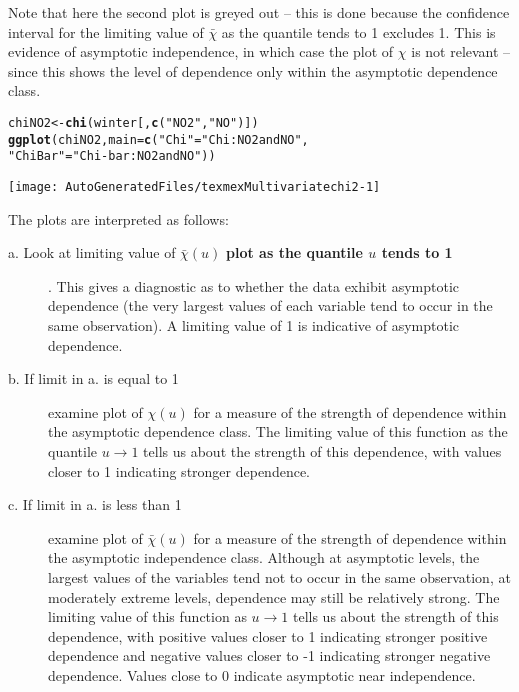 \documentclass[10pt]{article}\usepackage[]{graphicx}\usepackage[]{color}
\makeatletter
\def\maxwidth{ %
  \ifdim\Gin@nat@width>\linewidth
    \linewidth
  \else
    \Gin@nat@width
  \fi
}
\newcommand{\hlstr}[1]{\textcolor[rgb]{0.192,0.494,0.8}{#1}}%
\newcommand{\hlstd}[1]{\textcolor[rgb]{0.345,0.345,0.345}{#1}}%
\newcommand{\hlkwb}[1]{\textcolor[rgb]{0.69,0.353,0.396}{#1}}%
\newcommand{\hlkwc}[1]{\textcolor[rgb]{0.333,0.667,0.333}{#1}}%
\newcommand{\hlkwd}[1]{\textcolor[rgb]{0.737,0.353,0.396}{\textbf{#1}}}%
\newenvironment{kframe}{%
 \def\at@end@of@kframe{}%
 \ifinner\ifhmode%
  \def\at@end@of@kframe{\end{minipage}}%
  \begin{minipage}{\columnwidth}%
 \fi\fi%
 \def\FrameCommand##1{\hskip\@totalleftmargin \hskip-\fboxsep
 \colorbox{shadecolor}{##1}\hskip-\fboxsep
     \hskip-\linewidth \hskip-\@totalleftmargin \hskip\columnwidth}%
 \MakeFramed {\advance\hsize-\width
   \@totalleftmargin\z@ \linewidth\hsize
   \@setminipage}}%
 {\par\unskip\endMakeFramed%
 \at@end@of@kframe}
\newenvironment{knitrout}{}{} %
\makeatother
\begin{document}
Note that here the second plot is greyed out -- this is done because the confidence interval for the limiting value of $\bar\chi$ as the quantile tends to 1 excludes 1.  This is evidence of asymptotic independence, in which case the plot of $\chi$ is not relevant -- since this shows the level of dependence only within the asymptotic dependence class.

\begin{knitrout}
\color{fgcolor}\begin{kframe}
\begin{alltt}
\hlstd{chiNO2} \hlkwb{<-} \hlkwd{chi}\hlstd{(winter[,} \hlkwd{c}\hlstd{(}\hlstr{"NO2"}\hlstd{,} \hlstr{"NO"}\hlstd{)])}
\hlkwd{ggplot}\hlstd{(chiNO2,} \hlkwc{main}\hlstd{=}\hlkwd{c}\hlstd{(}\hlstr{"Chi"}\hlstd{=}\hlstr{"Chi: NO2 and NO"}\hlstd{,}
                      \hlstr{"ChiBar"}\hlstd{=}\hlstr{"Chi-bar: NO2 and NO"}\hlstd{))}
\end{alltt}
\end{kframe}
\texttt{[image: AutoGeneratedFiles/texmexMultivariatechi2-1]} 

\end{knitrout}

The plots are interpreted as follows:
\begin{description}
\item[a. Look at limiting value of $\bar\chi(u)$ \bf plot as the quantile $u$
tends to 1].  This gives a diagnostic as to whether the data
exhibit asymptotic dependence (the very largest values of each variable tend to
occur in the same observation).  A limiting value of 1 is indicative of asymptotic
dependence.

\item[b. If limit in a. is equal to 1] examine plot of
$\chi(u)$ for a measure of the strength of dependence within the
asymptotic dependence class.  The limiting value of this function as
the quantile $u\rightarrow1$ tells us about the strength of this dependence, with
values closer to 1 indicating stronger dependence.
\item[c. If limit in a. is less than 1] examine plot of
$\bar\chi(u)$ for a measure of the strength of dependence within the
asymptotic independence class. Although at asymptotic levels, the largest values
of the variables tend not to occur in the same observation, at moderately
extreme levels, dependence may still be relatively strong.  The limiting value
of this function as $u\rightarrow1$ tells us about the strength of this
dependence, with positive values closer to 1 indicating stronger positive
dependence and negative values closer to -1 indicating stronger negative
dependence.  Values close to 0 indicate asymptotic near independence.
\end{description}
\end{document}
